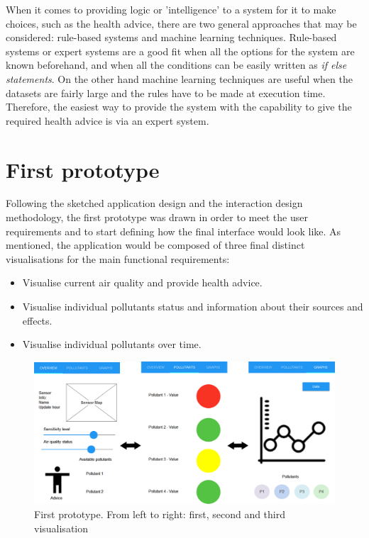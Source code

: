 When it comes to providing logic or 'intelligence' to a system for it to make choices, such as the health advice, there are two general approaches that may be considered: rule-based systems and machine learning techniques. Rule-based systems or expert systems are a good fit when all the options for the system are known beforehand, and when all the conditions can be easily written as \textit{if else statements}. On the other hand machine learning techniques are useful when the datasets are fairly large and the rules have to be made at execution time. Therefore, the easiest way to provide the system with the capability to give the required health advice is via an expert system.

\section{First prototype}
Following the sketched application design and the interaction design methodology, the first prototype was drawn in order to meet the user requirements and to start defining how the final interface would look like. As mentioned, the application would be composed of three final distinct visualisations for the main functional requirements:

\begin{itemize}
    \item Visualise current air quality and provide health advice.
    \item Visualise individual pollutants status and information about their sources and effects.
    \item Visualise individual pollutants over time.
\end{itemize}


\begin{figure}[H]
\begin{adjustbox}{width=1.2\textwidth,center=\textwidth}
  \centering
  \includegraphics[scale=1]{images/firstPrototype.png}
\end{adjustbox}
  \caption[Frist prototype]{First prototype. From left to right: first, second and third visualisation}
  \label{fig:first_visualization_first_prototype}
\end{figure}


